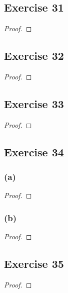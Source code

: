 \documentclass[14pt]{extarticle}
\begin{document}
\subsection{Exercise 31}

\begin{proof}

\end{proof}

\subsection{Exercise 32}

\begin{proof}

\end{proof}

\subsection{Exercise 33}

\begin{proof}

\end{proof}

\subsection{Exercise 34}

\subsubsection{(a)}

\begin{proof}

\end{proof}

\subsubsection{(b)}

\begin{proof}

\end{proof}

\subsection{Exercise 35}

\begin{proof}

\end{proof}
\end{document}
